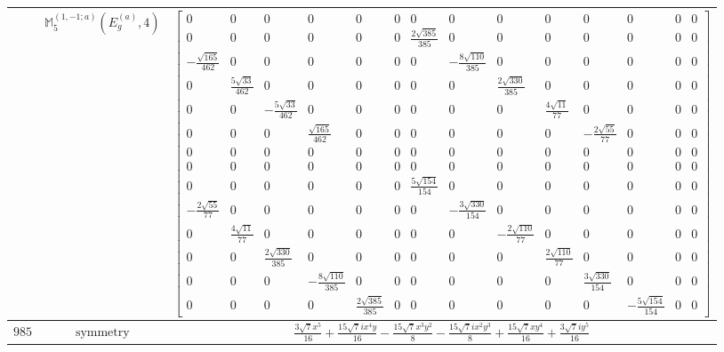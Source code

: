 \documentclass[fleqn,8pt,landscape]{jsarticle}
\begin{document}
\begin{longtable}{ccc}
$  $ & $ \mathbb{M}_{5}^{(1,-1;a)}(E_{g}^{(a)},4) $ & $ \begin{bmatrix} 0 & 0 & 0 & 0 & 0 & 0 & 0 & 0 & 0 & 0 & 0 & 0 & 0 & 0 \\ 0 & 0 & 0 & 0 & 0 & 0 & \frac{2 \sqrt{385}}{385} & 0 & 0 & 0 & 0 & 0 & 0 & 0 \\ - \frac{\sqrt{165}}{462} & 0 & 0 & 0 & 0 & 0 & 0 & - \frac{8 \sqrt{110}}{385} & 0 & 0 & 0 & 0 & 0 & 0 \\ 0 & \frac{5 \sqrt{33}}{462} & 0 & 0 & 0 & 0 & 0 & 0 & \frac{2 \sqrt{330}}{385} & 0 & 0 & 0 & 0 & 0 \\ 0 & 0 & - \frac{5 \sqrt{33}}{462} & 0 & 0 & 0 & 0 & 0 & 0 & \frac{4 \sqrt{11}}{77} & 0 & 0 & 0 & 0 \\ 0 & 0 & 0 & \frac{\sqrt{165}}{462} & 0 & 0 & 0 & 0 & 0 & 0 & - \frac{2 \sqrt{55}}{77} & 0 & 0 & 0 \\ 0 & 0 & 0 & 0 & 0 & 0 & 0 & 0 & 0 & 0 & 0 & 0 & 0 & 0 \\ 0 & 0 & 0 & 0 & 0 & 0 & 0 & 0 & 0 & 0 & 0 & 0 & 0 & 0 \\ 0 & 0 & 0 & 0 & 0 & 0 & \frac{5 \sqrt{154}}{154} & 0 & 0 & 0 & 0 & 0 & 0 & 0 \\ - \frac{2 \sqrt{55}}{77} & 0 & 0 & 0 & 0 & 0 & 0 & - \frac{3 \sqrt{330}}{154} & 0 & 0 & 0 & 0 & 0 & 0 \\ 0 & \frac{4 \sqrt{11}}{77} & 0 & 0 & 0 & 0 & 0 & 0 & - \frac{2 \sqrt{110}}{77} & 0 & 0 & 0 & 0 & 0 \\ 0 & 0 & \frac{2 \sqrt{330}}{385} & 0 & 0 & 0 & 0 & 0 & 0 & \frac{2 \sqrt{110}}{77} & 0 & 0 & 0 & 0 \\ 0 & 0 & 0 & - \frac{8 \sqrt{110}}{385} & 0 & 0 & 0 & 0 & 0 & 0 & \frac{3 \sqrt{330}}{154} & 0 & 0 & 0 \\ 0 & 0 & 0 & 0 & \frac{2 \sqrt{385}}{385} & 0 & 0 & 0 & 0 & 0 & 0 & - \frac{5 \sqrt{154}}{154} & 0 & 0 \end{bmatrix} $ \\ \hline
$ 985 $ & $ \text{symmetry} $ & $ \frac{3 \sqrt{7} x^{5}}{16} + \frac{15 \sqrt{7} i x^{4} y}{16} - \frac{15 \sqrt{7} x^{3} y^{2}}{8} - \frac{15 \sqrt{7} i x^{2} y^{3}}{8} + \frac{15 \sqrt{7} x y^{4}}{16} + \frac{3 \sqrt{7} i y^{5}}{16} $ \\

\end{longtable}
\end{document}
